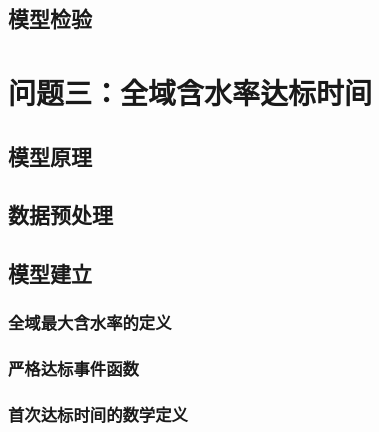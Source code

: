 \documentclass[withoutpreface,bwprint]{cumcmthesis}
\begin{document}
\subsection{模型检验}






























\section{问题三：全域含水率达标时间}


\subsection{模型原理}


\subsection{数据预处理}


\subsection{模型建立}

\subsubsection{全域最大含水率的定义}
\subsubsection{严格达标事件函数}
\subsubsection{首次达标时间的数学定义}
\end{document}
